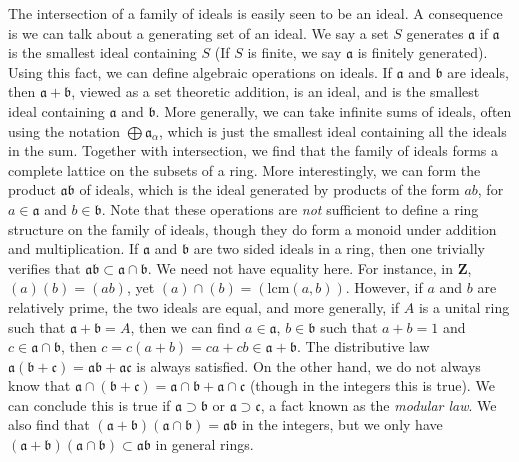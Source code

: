 The intersection of a family of ideals is easily seen to be an ideal. A consequence is we can talk about a generating set of an ideal. We say a set $S$ generates $\mathfrak{a}$ if $\mathfrak{a}$ is the smallest ideal containing $S$ (If $S$ is finite, we say $\mathfrak{a}$ is finitely generated). Using this fact, we can define algebraic operations on ideals. If $\mathfrak{a}$ and $\mathfrak{b}$ are ideals, then $\mathfrak{a} + \mathfrak{b}$, viewed as a set theoretic addition, is an ideal, and is the smallest ideal containing $\mathfrak{a}$ and $\mathfrak{b}$. More generally, we can take infinite sums of ideals, often using the notation $\bigoplus \mathfrak{a}_\alpha$, which is just the smallest ideal containing all the ideals in the sum. Together with intersection, we find that the family of ideals forms a complete lattice on the subsets of a ring. More interestingly, we can form the product $\mathfrak{a} \mathfrak{b}$ of ideals, which is the ideal generated by products of the form $ab$, for $a \in \mathfrak{a}$ and $b \in \mathfrak{b}$. Note that these operations are {\it not} sufficient to define a ring structure on the family of ideals, though they do form a monoid under addition and multiplication. If $\mathfrak{a}$ and $\mathfrak{b}$ are two sided ideals in a ring, then one trivially verifies that $\mathfrak{a} \mathfrak{b} \subset \mathfrak{a} \cap \mathfrak{b}$. We need not have equality here. For instance, in $\mathbf{Z}$, $(a)(b) = (ab)$, yet $(a) \cap (b) = (\text{lcm}(a,b))$. However, if $a$ and $b$ are relatively prime, the two ideals are equal, and more generally, if $A$ is a unital ring such that $\mathfrak{a} + \mathfrak{b} = A$, then we can find $a \in \mathfrak{a}$, $b \in \mathfrak{b}$ such that $a + b = 1$ and $c \in \mathfrak{a} \cap \mathfrak{b}$, then $c = c(a + b) = ca + cb \in \mathfrak{a} + \mathfrak{b}$. The distributive law $\mathfrak{a}(\mathfrak{b} + \mathfrak{c}) = \mathfrak{a} \mathfrak{b} + \mathfrak{a} \mathfrak{c}$ is always satisfied. On the other hand, we do not always know that $\mathfrak{a} \cap (\mathfrak{b} + \mathfrak{c}) = \mathfrak{a} \cap \mathfrak{b} + \mathfrak{a} \cap \mathfrak{c}$ (though in the integers this is true). We can conclude this is true if $\mathfrak{a} \supset \mathfrak{b}$ or $\mathfrak{a} \supset \mathfrak{c}$, a fact known as the {\it modular law}. We also find that $(\mathfrak{a} + \mathfrak{b})(\mathfrak{a} \cap \mathfrak{b}) = \mathfrak{a}\mathfrak{b}$ in the integers, but we only have $(\mathfrak{a} + \mathfrak{b})(\mathfrak{a} \cap \mathfrak{b}) \subset \mathfrak{a}\mathfrak{b}$ in general rings.

